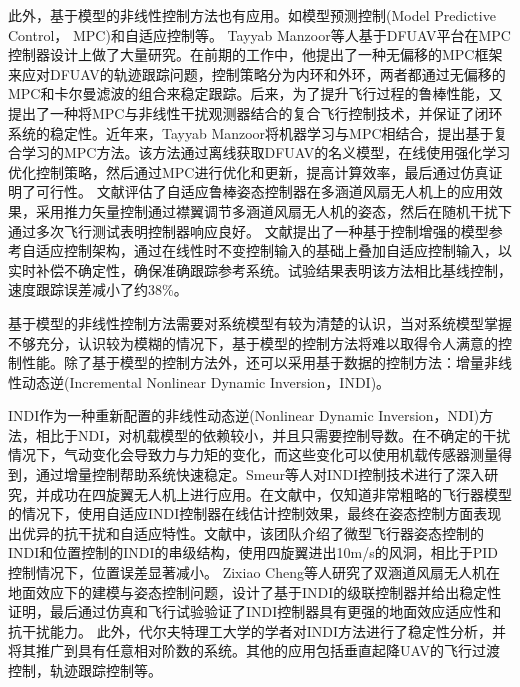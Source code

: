 此外，基于模型的非线性控制方法也有应用。如模型预测控制(Model Predictive Control， MPC)和自适应控制等。
Tayyab Manzoor等人基于DFUAV平台在MPC控制器设计上做了大量研究。在前期的工作中，他提出了一种无偏移的MPC框架来应对DFUAV的轨迹跟踪问题\cite{manzoor2020trajectory}，控制策略分为内环和外环，两者都通过无偏移的MPC和卡尔曼滤波的组合来稳定跟踪。后来，为了提升飞行过程的鲁棒性能，又提出了一种将MPC与非线性干扰观测器结合的复合飞行控制技术\cite{manzoorMPCBasedCompound2020,manzoorCompositeObserverbasedRobust2023}，并保证了闭环系统的稳定性。近年来，Tayyab Manzoor将机器学习与MPC相结合，提出基于复合学习的MPC方法\cite{manzoorModelPredictiveControl2023,manzoorCompoundLearningBasedModel2024}。该方法通过离线获取DFUAV的名义模型，在线使用强化学习优化控制策略，然后通过MPC进行优化和更新，提高计算效率，最后通过仿真证明了可行性。
文献\parencite{isaac2024sensing}评估了自适应鲁棒姿态控制器在多涵道风扇无人机上的应用效果，采用推力矢量控制通过襟翼调节多涵道风扇无人机的姿态，然后在随机干扰下通过多次飞行测试表明控制器响应良好。
文献\parencite{aiRobustAdaptiveControl2025}提出了一种基于控制增强的模型参考自适应控制架构，通过在线性时不变控制输入的基础上叠加自适应控制输入，以实时补偿不确定性，确保准确跟踪参考系统。试验结果表明该方法相比基线控制，速度跟踪误差减小了约38\%。


基于模型的非线性控制方法需要对系统模型有较为清楚的认识，当对系统模型掌握不够充分，认识较为模糊的情况下，基于模型的控制方法将难以取得令人满意的控制性能\cite{zhangReviewDuctedFans2020b}。除了基于模型的控制方法外，还可以采用基于数据的控制方法：增量非线性动态逆(Incremental Nonlinear Dynamic Inversion，INDI)。

INDI作为一种重新配置的非线性动态逆(Nonlinear Dynamic Inversion，NDI)方法\cite{baconReconfigurableNDIController2001b,grondman2018design}，相比于NDI，对机载模型的依赖较小，并且只需要控制导数。在不确定的干扰情况下，气动变化会导致力与力矩的变化，而这些变化可以使用机载传感器测量得到，通过增量控制帮助系统快速稳定。Smeur等人对INDI控制技术进行了深入研究\cite{smeur2016adaptive,smeurCascadedIncrementalNonlinear2018b,steffensenNonlinearDynamicInversion2023}，并成功在四旋翼无人机上进行应用。在文献\parencite{smeur2016adaptive}中，仅知道非常粗略的飞行器模型的情况下，使用自适应INDI控制器在线估计控制效果，最终在姿态控制方面表现出优异的抗干扰和自适应特性。文献\parencite{smeurCascadedIncrementalNonlinear2018b}中，该团队介绍了微型飞行器姿态控制的INDI和位置控制的INDI的串级结构，使用四旋翼进出10m/s的风洞，相比于PID控制情况下，位置误差显著减小。
Zixiao Cheng等人研究了双涵道风扇无人机在地面效应下的建模与姿态控制问题，设计了基于INDI的级联控制器并给出稳定性证明，最后通过仿真和飞行试验验证了INDI控制器具有更强的地面效应适应性和抗干扰能力\cite{cheng2024incremental}。
此外，代尔夫特理工大学的学者对INDI方法进行了稳定性分析\cite{wangStabilityAnalysisIncremental2019b}，并将其推广到具有任意相对阶数的系统。其他的应用包括垂直起降UAV的飞行过渡控制\cite{chengCorridorbasedFlightMode2023}，轨迹跟踪控制\cite{taherinezhadEnhancedIncrementalNonlinear2023a}等。

